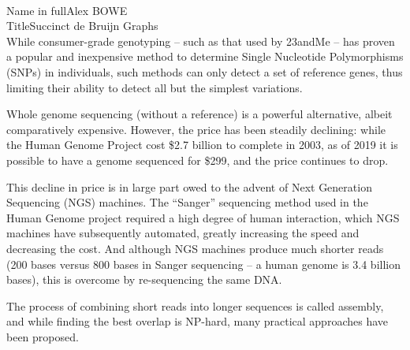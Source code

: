 \documentclass[a4paper,11pt]{article}
\begin{document}
\pagestyle{empty}
\thispagestyle{fancy}
\fontsize{13}{15.6}\selectfont
\vspace*{-.35cm}
\hspace*{\fill}\\[2ex]

\noindent Name in full\quad Alex BOWE\\[1ex]

\noindent Title\quad Succinct de Bruijn Graphs\\

While consumer-grade genotyping -- such as that used by 23andMe -- has proven a popular and inexpensive method to determine Single Nucleotide Polymorphisms (SNPs) in individuals, such methods can only detect a set of reference genes, thus limiting their ability to detect all but the simplest variations.

Whole genome sequencing (without a reference) is a powerful alternative, albeit comparatively expensive. However, the price has been steadily declining: while the Human Genome Project cost \$2.7 billion to complete in 2003, as of 2019 it is possible to have a genome sequenced for \$299, and the price continues to drop.

This decline in price is in large part owed to the advent of Next Generation Sequencing (NGS) machines. The “Sanger” sequencing method used in the Human Genome project required a high degree of human interaction, which NGS machines have subsequently automated, greatly increasing the speed and decreasing the cost. And although NGS machines produce much shorter reads (200 bases versus 800 bases in Sanger sequencing -- a human genome is 3.4 billion bases), this is overcome by re-sequencing the same DNA.


The process of combining short reads into longer sequences is called assembly, and while finding the best overlap is NP-hard, many practical approaches have been proposed.
\end{document}
